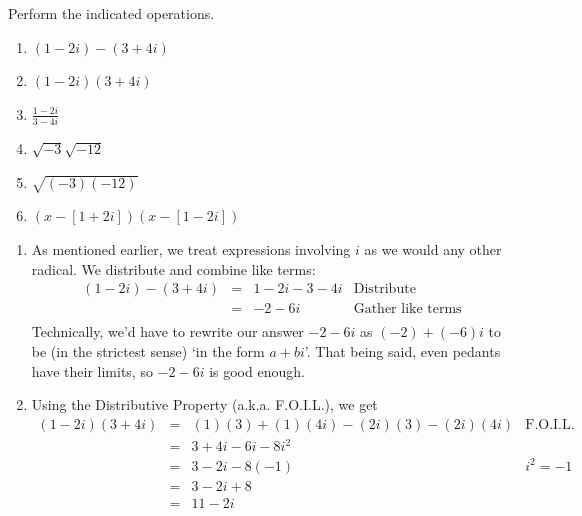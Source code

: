 \documentclass{ximera}
\begin{document}
\begin{example} \label{complexzeroex1} Perform the indicated operations.
\label{complexnumberarithmetic}


\begin{enumerate}

\item  $(1-2i) - (3+4i)$ 

\item  $(1-2i)(3+4i)$ 

\item  $\frac{1-2i}{3-4i}$

\item  $\sqrt{-3} \sqrt{-12}$

\item  $\sqrt{(-3)(-12)}$

\item  $(x-[1+2i])(x-[1-2i])$

\end{enumerate}

\begin{explanation}

\begin{enumerate}

\item  As mentioned earlier, we treat expressions involving $i$ as we would any other radical. We distribute and combine like terms:\[ \begin{array}{rclr}

 (1-2i) - (3+4i) & = &  1-2i-3-4i & \text{Distribute} \\
& = &  -2 - 6i & \text{Gather like terms} \\
\end{array}\] Technically, we'd have to rewrite our answer  $-2-6i$ as $(-2) + (-6)i$ to be (in the strictest sense) `in the form $a+bi$'. That being said, even pedants have their limits, so $-2-6i$ is good enough.

\item  Using the Distributive Property (a.k.a. F.O.I.L.), we get \[ \begin{array}{rclr}

  (1-2i)(3+4i)  & = & (1)(3) + (1)(4i) - (2i)(3) - (2i)(4i) & \text{F.O.I.L.} \\
	              & = & 3+4i-6i-8i^2 & \\
	& = & 3 - 2i - 8(-1) & \text{$i^2=-1$} \\
	& = & 3 - 2i + 8 & \\
	& = & 11 - 2i & \\ \end{array}\]


\end{enumerate}
\end{explanation}
\end{example}
\end{document}
